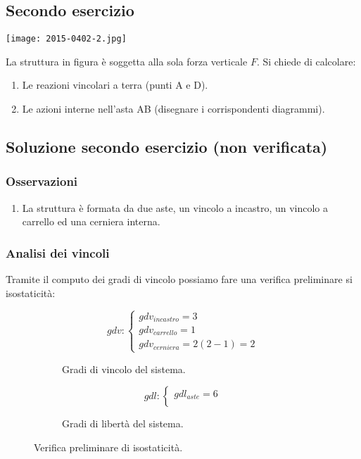 \documentclass[main.tex]{subfiles}
\begin{document}
\subsection{Secondo esercizio}
\texttt{[image: 2015-0402-2.jpg]}

La struttura in figura è soggetta alla sola forza verticale $F$.
Si chiede di calcolare:

\begin{enumerate}
\item Le reazioni vincolari a terra (punti A e D).
\item Le azioni interne nell’asta AB (disegnare i corrispondenti diagrammi).
\end{enumerate}
\clearpage

\subsection{Soluzione secondo esercizio (non verificata)}

\subsubsection{Osservazioni}

\begin{enumerate}
\item La struttura è formata da due aste, un vincolo a incastro, un vincolo a carrello ed una cerniera interna.
\end{enumerate}

\subsubsection{Analisi dei vincoli}
Tramite il computo dei gradi di vincolo possiamo fare una verifica preliminare si isostaticità:

\begin{figure}[H]
  \begin{subfigure}[b]{.5\textwidth}
  \centering
  \[
  	gdv: \begin{cases}
		gdv_{incastro} = 3\\
		gdv_{carrello} = 1\\
		gdv_{cerniera} = 2(2-1) = 2
  	\end{cases}
  \]
  \caption{Gradi di vincolo del sistema.}
  \end{subfigure}
  \hfill
  \begin{subfigure}[b]{.5\textwidth}
  \centering
  \[
  	gdl: \begin{cases}
  		gdl_{aste} = 6\\
  	\end{cases}
  \]
  \caption{Gradi di libertà del sistema.}
  \end{subfigure}
  \caption{Verifica preliminare di isostaticità.}
\end{figure}
\end{document}
